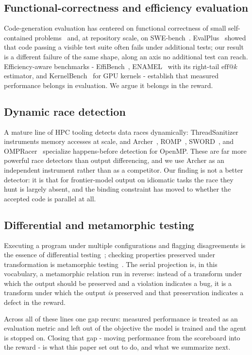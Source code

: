 \subsection{Functional-correctness and efficiency evaluation}

Code-generation evaluation has centered on functional correctness of small
self-contained problems~\cite{humaneval} and, at repository scale, on
SWE-bench~\cite{swebench}. EvalPlus~\cite{evalplus} showed that code passing a
visible test suite often fails under additional tests; our result is a
different failure of the same shape, along an axis no additional test can
reach. Efficiency-aware benchmarks - EffiBench~\cite{effibench},
ENAMEL~\cite{enamel} with its right-tail $\mathrm{eff}@k$ estimator, and
KernelBench~\cite{kernelbench} for GPU kernels - establish that measured
performance belongs in evaluation. We argue it belongs in the reward.

\subsection{Dynamic race detection}

A mature line of HPC tooling detects data races dynamically:
ThreadSanitizer~\cite{tsan} instruments memory accesses at scale, and
Archer~\cite{archer}, ROMP~\cite{romp}, SWORD~\cite{sword}, and
OMPRacer~\cite{ompracer} specialize happens-before detection for OpenMP. These
are far more powerful race detectors than output differencing, and we use
Archer as an independent instrument rather than as a competitor. Our finding is
not a better detector: it is that for frontier-model output on idiomatic tasks
the race they hunt is largely absent, and the binding constraint has moved to
whether the accepted code is parallel at all.

\subsection{Differential and metamorphic testing}

Executing a program under multiple configurations and flagging disagreements is
the essence of differential testing~\cite{difftesting}; checking properties
preserved under transformation is metamorphic testing~\cite{metamorphic}. The
serial projection is, in this vocabulary, a metamorphic relation run in
reverse: instead of a transform under which the output should be preserved and
a violation indicates a bug, it is a transform under which the output
\emph{is} preserved and that preservation indicates a defect in the reward.

Across all of these lines one gap recurs: measured performance is treated as an
evaluation metric and left out of the objective the model is trained and the
agent is stopped on. Closing that gap - moving performance from the scoreboard
into the reward - is what this paper set out to do, and what we summarize next.
